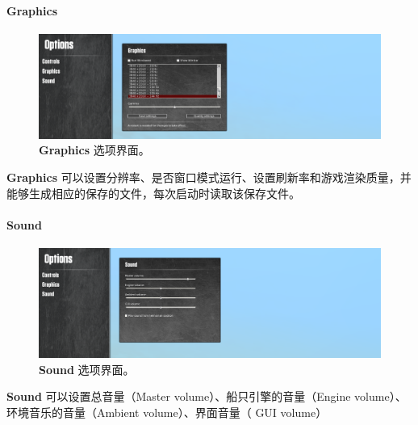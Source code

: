 \documentclass[letterpaper,10pt]{article}
\begin{document}
					
					\paragraph{Graphics}
					
					\begin{figure}[htbp]
						\centering 
						\includegraphics[width=\columnwidth]{picture/Options_Graphics}
						\caption{
							\label{fig: Options_Graphics} 
							\textbf{Graphics} 选项界面。
						}	
					\end{figure}
					
					\textbf{Graphics} 可以设置分辨率、是否窗口模式运行、设置刷新率和游戏渲染质量，并能够生成相应的保存的文件，每次启动时读取该保存文件。
					
					\paragraph{Sound}
					
					\begin{figure}[htbp]
						\centering 
						\includegraphics[width=\columnwidth]{picture/Options_Sound}
						\caption{
							\label{fig: Options_Sound} 
							\textbf{Sound} 选项界面。
						}	
					\end{figure}
					
					\textbf{Sound} 可以设置总音量（Master volume）、船只引擎的音量（Engine volume）、环境音乐的音量（Ambient volume）、界面音量（ GUI volume）
				
\end{document}

